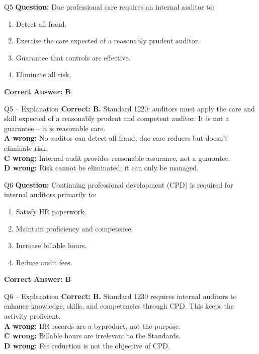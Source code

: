 \documentclass[aspectratio=169,10pt]{beamer}
\begin{document}
	\begin{frame}[t]{Q5}
		\small
		\textbf{Question:} Due professional care requires an internal auditor to:
		\begin{enumerate}[label=\Alph*.,itemsep=1pt,topsep=2pt]
			\item Detect all fraud.
			\item Exercise the care expected of a reasonably prudent auditor.
			\item Guarantee that controls are effective.
			\item Eliminate all risk.
		\end{enumerate}
		\vspace{4pt}
		\textbf{Correct Answer: B}
	\end{frame}
	
	\begin{frame}[t]{Q5 -- Explanation}
		\small
		\textbf{Correct: B.} Standard 1220: auditors must apply the care and skill expected of a reasonably prudent and competent auditor. It is not a guarantee -- it is reasonable care. \\[4pt]
		\textbf{A wrong:} No auditor can detect all fraud; due care reduces but doesn't eliminate risk. \\[2pt]
		\textbf{C wrong:} Internal audit provides reasonable assurance, not a guarantee. \\[2pt]
		\textbf{D wrong:} Risk cannot be eliminated; it can only be managed.
	\end{frame}
	
	\begin{frame}[t]{Q6}
		\small
		\textbf{Question:} Continuing professional development (CPD) is required for internal auditors primarily to:
		\begin{enumerate}[label=\Alph*.,itemsep=1pt,topsep=2pt]
			\item Satisfy HR paperwork.
			\item Maintain proficiency and competence.
			\item Increase billable hours.
			\item Reduce audit fees.
		\end{enumerate}
		\vspace{4pt}
		\textbf{Correct Answer: B}
	\end{frame}
	
	\begin{frame}[t]{Q6 -- Explanation}
		\small
		\textbf{Correct: B.} Standard 1230 requires internal auditors to enhance knowledge, skills, and competencies through CPD. This keeps the activity proficient. \\[4pt]
		\textbf{A wrong:} HR records are a byproduct, not the purpose. \\[2pt]
		\textbf{C wrong:} Billable hours are irrelevant to the Standards. \\[2pt]
		\textbf{D wrong:} Fee reduction is not the objective of CPD.
	\end{frame}
	
\end{document}
